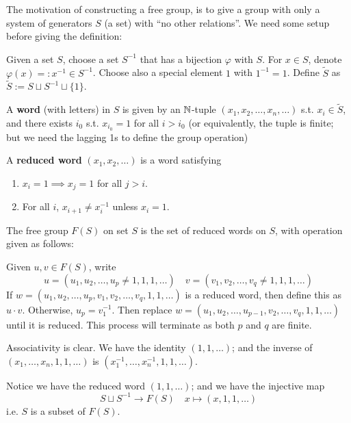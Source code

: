 \documentclass{article}
\begin{document}
\textstart
The motivation of constructing a free group, is to give a group with only a system of generators $S$ (a set) with ``no other relations''. We need some setup before giving the definition:

\begin{definition}[Word]
    Given a set $S$, choose a set $S^{-1}$ that has a bijection $\varphi$ with $S$. For $x \in S$, denote $\varphi(x) =: x^{-1} \in S^{-1}$. Choose also a special element $1$ with $1^{-1} = 1$. Define $\widetilde{S}$ as $\widetilde{S} := S \sqcup S^{-1} \sqcup \{1\}$.

    A \textbf{word} (with letters) in $S$ is given by an $\mathbb{N}$-tuple $(x_1, x_2, \dots, x_n, \dots)$ s.t. $x_i \in \widetilde{S}$, and there exists $i_0$ s.t. $x_{i_0} = 1$ for all $i > i_0$ (or equivalently, the tuple is finite; but we need the lagging 1s to define the group operation)
\end{definition}

\begin{definition}
    A \textbf{reduced word} $(x_1, x_2, \dots)$ is a word satisfying
    \begin{enumerate}[label=\arabic*)]
        \item $x_i = 1 \implies x_j = 1$ for all $j > i$.
        \item For all $i$, $x_{i+1} \neq x_i^{-1}$ unless $x_i = 1$.
    \end{enumerate}
\end{definition}

\begin{definition}
    The free group $F(S)$ on set $S$ is the set of reduced words on $S$, with operation given as follows:

    Given $u, v \in F(S)$, write
    \[
        u = (u_1, u_2, \dots, u_p \neq 1, 1, 1, \dots) \quad v = (v_1, v_2, \dots, v_q \neq 1, 1, 1, \dots)
    \]
    If $w = (u_1, u_2, \dots, u_p, v_1, v_2, \dots, v_q, 1, 1, \dots)$ is a reduced word, then define this as $u \cdot v$. Otherwise, $u_p = v_1^{-1}$. Then replace $w = (u_1, u_2, \dots, u_{p-1}, v_2, \dots, v_q, 1, 1, \dots)$ until it is reduced. This process will terminate as both $p$ and $q$ are finite.

    Associativity is clear. We have the identity $(1, 1, \dots)$; and the inverse of $(x_1, \dots, x_n, 1, 1, \dots)$ is $(x_1^{-1}, \dots, x_n^{-1}, 1, 1, \dots)$.
\end{definition}

\textstart
Notice we have the reduced word $(1, 1, \dots)$; and we have the injective map
\[
    S \sqcup S^{-1} \to F(S) \quad x \mapsto (x, 1, 1, \dots)
\]
i.e. $S$ is a subset of $F(S)$.
\end{document}

